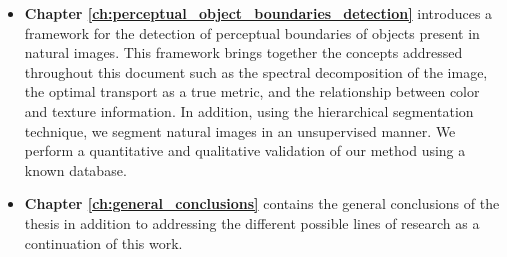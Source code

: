 \begin{itemize}
	\item \textbf{Chapter \ref{ch:perceptual_object_boundaries_detection}} introduces a framework for the detection of perceptual boundaries of objects present in natural images. This framework brings together the concepts addressed throughout this document such as the spectral decomposition of the image, the optimal transport as a true metric, and the relationship between color and texture information. In addition, using the hierarchical segmentation technique, we segment natural images in an unsupervised manner. We perform a quantitative and qualitative validation of our method using a known database.
	
	\item \textbf{Chapter \ref{ch:general_conclusions}} contains the general conclusions of the thesis in addition to addressing the different possible lines of research as a continuation of this work.
	
\end{itemize}